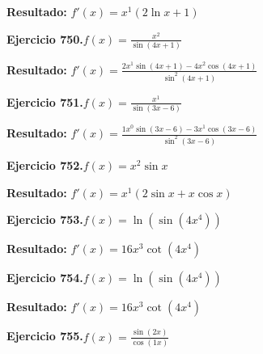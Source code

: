 \documentclass[10pt,a4paper]{article}
\begin{document}
\begin{solbox}
\textbf{Resultado:} \(\displaystyle f'(x) = x^{1}(2\ln x + 1)\)
\end{solbox}

\begin{ejbox}
\textbf{Ejercicio 750.}\quad $f(x) = \frac{x^{2}}{\sin(4x +1)}$
\end{ejbox}

\begin{solbox}
\textbf{Resultado:} \(\displaystyle f'(x) = \frac{2x^{1}\sin(4x +1) - 4x^{2}\cos(4x +1)}{\sin^2(4x +1)}\)
\end{solbox}

\newpage
\begin{ejbox}
\textbf{Ejercicio 751.}\quad $f(x) = \frac{x^{1}}{\sin(3x -6)}$
\end{ejbox}

\begin{solbox}
\textbf{Resultado:} \(\displaystyle f'(x) = \frac{1x^{0}\sin(3x -6) - 3x^{1}\cos(3x -6)}{\sin^2(3x -6)}\)
\end{solbox}

\begin{ejbox}
\textbf{Ejercicio 752.}\quad $f(x) = x^{2} \sin x$
\end{ejbox}

\begin{solbox}
\textbf{Resultado:} \(\displaystyle f'(x) = x^{1}(2\sin x + x\cos x)\)
\end{solbox}

\begin{ejbox}
\textbf{Ejercicio 753.}\quad $f(x) = \ln(\sin(4x^{4}))$
\end{ejbox}

\begin{solbox}
\textbf{Resultado:} \(\displaystyle f'(x) = 16x^{3}\cot(4x^{4})\)
\end{solbox}

\newpage
\begin{ejbox}
\textbf{Ejercicio 754.}\quad $f(x) = \ln(\sin(4x^{4}))$
\end{ejbox}

\begin{solbox}
\textbf{Resultado:} \(\displaystyle f'(x) = 16x^{3}\cot(4x^{4})\)
\end{solbox}

\begin{ejbox}
\textbf{Ejercicio 755.}\quad $f(x) = \frac{\sin(2x)}{\cos(1x)}$
\end{ejbox}
\end{document}
